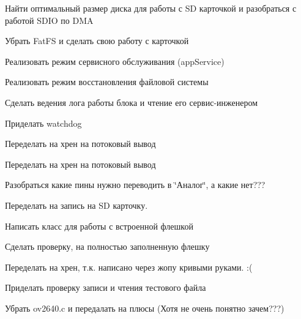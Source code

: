
\begin{DoxyRefList}
\item[\label{todo__todo000007}%
\Hypertarget{todo__todo000007}%
Член \hyperlink{group___xD0_x9F_xD0_xB5_xD1_x80_xD0_xB5_xD1_x87_xD0_xB8_xD1_x81_xD0_xBB_xD0_xB5_xD0_xBD_xD0_xB8_xD1_x8F_ga290e8080c661e52c2f685fd4af148acf}{app\+:\+:app\+State} ]Найти оптимальный размер диска для работы с SD карточкой и разобраться с работой S\+D\+IO по D\+MA 

Убрать Fat\+FS и сделать свою работу с карточкой 

Реализовать режим сервисного обслуживания (app\+Service) 

Реализовать режим восстановления файловой системы  
\item[\label{todo__todo000004}%
\Hypertarget{todo__todo000004}%
Класс \hyperlink{classapp_1_1_t_application}{app\+:\+:T\+Application} ]Сделать ведения лога работы блока и чтение его сервис-\/инженером 

Приделать watchdog  
\item[\label{todo__todo000002}%
\Hypertarget{todo__todo000002}%
Член \hyperlink{classapp_1_1_t_application_a9f4f8b1ef208edca2c5ea5ef1851efca}{app\+:\+:T\+Application\+:\+:debug\+Message} (const uint8\+\_\+t $\ast$, const std\+::size\+\_\+t)]Переделать на хрен на потоковый вывод  
\item[\label{todo__todo000001}%
\Hypertarget{todo__todo000001}%
Член \hyperlink{classapp_1_1_t_application_abec229b87538c5db318ef57f25f6e84d}{app\+:\+:T\+Application\+:\+:debug\+Message} (const std\+::string \&)]Переделать на хрен на потоковый вывод  
\item[\label{todo__todo000003}%
\Hypertarget{todo__todo000003}%
Член \hyperlink{classapp_1_1_t_application_ab44dd5aa2afe1d66b2588e908bfad4d0}{app\+:\+:T\+Application\+:\+:sleep} ()]Разобраться какие пины нужно переводить в \char`\"{}Аналог\char`\"{}, а какие нет???  
\item[\label{todo__todo000010}%
\Hypertarget{todo__todo000010}%
Класс \hyperlink{classapp_1_1_t_log}{app\+:\+:T\+Log} ]Переделать на запись на SD карточку. 

Написать класс для работы с встроенной флешкой  
\item[\label{todo__todo000009}%
\Hypertarget{todo__todo000009}%
Член \hyperlink{classapp_1_1_t_log_a9f8a10a82504933ab909b90ea9413b65}{app\+:\+:T\+Log\+:\+:T\+Log} ()]Сделать проверку, на полностью заполненную флешку  
\item[\label{todo__todo000005}%
\Hypertarget{todo__todo000005}%
Член \hyperlink{classunit_1_1_t_audio_ad547ef4d28534b9cd76d2e7eb539d1e0}{unit\+:\+:T\+Audio\+:\+:process} ()]Переделать на хрен, т.\+к. написано через жопу кривыми руками. \+:(  
\item[\label{todo__todo000008}%
\Hypertarget{todo__todo000008}%
Член \hyperlink{classunit_1_1_t_file_system_a0737b50d219570ae2e11ea17a32cc85c}{unit\+:\+:T\+File\+System\+:\+:check} ()]Приделать проверку записи и чтения тестового файла  
\item[\label{todo__todo000012}%
\Hypertarget{todo__todo000012}%
Класс \hyperlink{classunit_1_1_t_photo}{unit\+:\+:T\+Photo} ]Убрать ov2640.\+c и передалать на плюсы (Хотя не очень понятно зачем???) 


\end{DoxyRefList}

